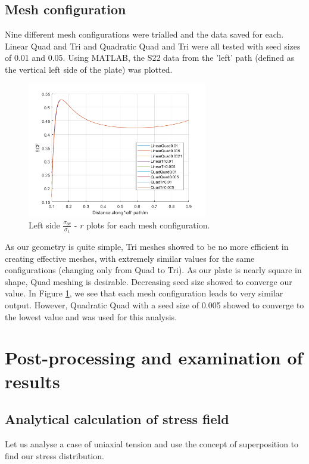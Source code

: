 \documentclass[11pt]{article}
\numberwithin{equation}{section}
\begin{document}
\subsection{Mesh configuration}
Nine different mesh configurations were trialled and the data saved for each. Linear Quad and Tri and Quadratic Quad and Tri were all tested with seed sizes of 0.01 and 0.05. Using MATLAB, the S22 data from the 'left' path (defined as the vertical left side of the plate) was plotted.
\begin{figure}[H]
    \centering
    \includegraphics[width = 0.7\textwidth]{./img/diagram1.png}
    \caption{Left side $\frac{\sigma_{\theta\theta}}{\sigma_1}$ - $r$ plots for each mesh configuration.}
    \label{meshconfig}
\end{figure}
As our geometry is quite simple, Tri meshes showed to be no more efficient in creating effective meshes, with extremely similar values for the same configurations (changing only from Quad to Tri). As our plate is nearly square in shape, Quad meshing is desirable. Decreasing seed size showed to converge our value. In Figure \ref{meshconfig}, we see that each mesh configuration leads to very similar output. However, Quadratic Quad with a seed size of 0.005 showed to converge to the lowest value and was used for this analysis. 
\section{Post-processing and examination of results}
\subsection{Analytical calculation of stress field}
Let us analyse a case of uniaxial tension and use the concept of superposition to find our stress distribution.
\end{document}
